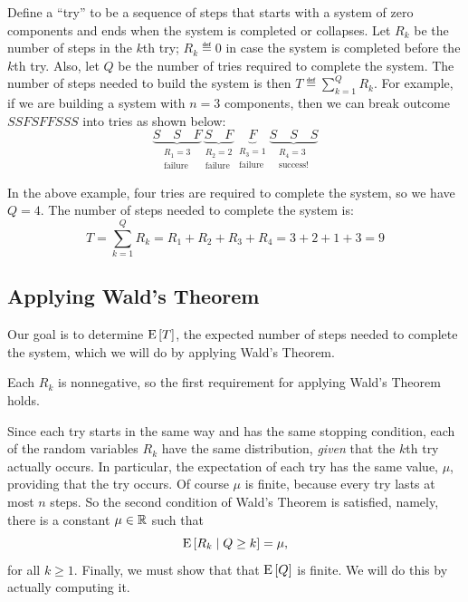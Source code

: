 \documentclass[11pt,twoside]{article}
\begin{document}
Define a ``try'' to be a sequence of steps that starts with a system
of zero components and ends when the system is completed or collapses.
Let $R_k$ be the number of steps in the $k$th try; $R_k \eqdef 0$ in case
the system is completed before the $k$th try.  Also, let $Q$ be the
number of tries required to complete the system.  The number of steps
needed to build the system is then $T \eqdef \sum_{k=1}^Q R_k$.  For
example, if we are building a system with $n = 3$ components, then we
can break outcome $SSFSFFSSS$ into tries as shown below:
\[
\underbrace{S \quad S \quad F}_{
        \begin{array}{c} R_1 = 3 \\ \text{failure} \end{array}}
\underbrace{S \quad F}_{
        \begin{array}{c} R_2 = 2 \\ \text{failure} \end{array}}
\underbrace{F}_{
        \begin{array}{c} R_3 = 1 \\ \text{failure} \end{array}}
\underbrace{S \quad S \quad S}_{
        \begin{array}{c} R_4 = 3 \\ \text{success!} \end{array}}
\]

In the above example, four tries are required to complete the system,
so we have $Q = 4$.  The number of steps needed to complete the system
is:
\[
T = \sum_{k=1}^Q R_k = R_1 + R_2 + R_3 + R_4 = 3 + 2 + 1 + 3 = 9
\]

\subsection{Applying Wald's Theorem}

Our goal is to determine $\mathop{\textup{E}}\nolimits\left[T\right]$, the expected number of steps needed
to complete the system, which we will do by applying Wald's Theorem.

Each $R_k$ is nonnegative, so the first requirement for applying Wald's
Theorem holds.

Since each try starts in the same way and has the same stopping condition,
each of the random variables $R_k$ have the same distribution,
\emph{given} that the $k$th try actually occurs.  In particular, the
expectation of each try has the same value, $\mu$, providing that the try
occurs.  Of course $\mu$ is finite, because every try lasts at most $n$
steps.  So the second condition of Wald's Theorem is satisfied, namely,
there is a constant $\mu \in \mathbb{R}$ such that
\[
\mathop{\textup{E}}\nolimits\left[R_k\mid Q \geq k\right] = \mu,
\]
for all $k\geq 1$.  Finally, we must show that that $\mathop{\textup{E}}\nolimits\left[Q\right]$ is
finite.  We will do this by actually computing it.
\end{document}
